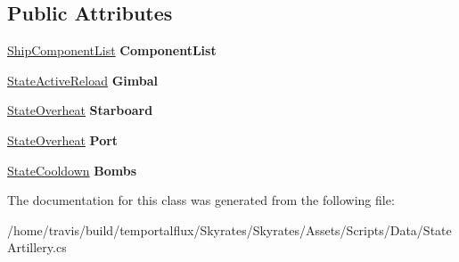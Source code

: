 \subsection*{Public Attributes}
\begin{DoxyCompactItemize}
\item 
\hypertarget{class_skyrates_1_1_data_1_1_state_artillery_a54162b2fadd29081814fb07464263928}{\hyperlink{class_skyrates_1_1_ship_1_1_ship_component_list}{Ship\-Component\-List} {\bfseries Component\-List}}\label{class_skyrates_1_1_data_1_1_state_artillery_a54162b2fadd29081814fb07464263928}

\item 
\hypertarget{class_skyrates_1_1_data_1_1_state_artillery_a6bb24342380db95bc7ca435bf143175c}{\hyperlink{class_skyrates_1_1_misc_1_1_state_active_reload}{State\-Active\-Reload} {\bfseries Gimbal}}\label{class_skyrates_1_1_data_1_1_state_artillery_a6bb24342380db95bc7ca435bf143175c}

\item 
\hypertarget{class_skyrates_1_1_data_1_1_state_artillery_a2dde97010bf9eab4c1537231e2c5d433}{\hyperlink{class_skyrates_1_1_misc_1_1_state_overheat}{State\-Overheat} {\bfseries Starboard}}\label{class_skyrates_1_1_data_1_1_state_artillery_a2dde97010bf9eab4c1537231e2c5d433}

\item 
\hypertarget{class_skyrates_1_1_data_1_1_state_artillery_a8f4401a53c2862f8cea695ca7133a458}{\hyperlink{class_skyrates_1_1_misc_1_1_state_overheat}{State\-Overheat} {\bfseries Port}}\label{class_skyrates_1_1_data_1_1_state_artillery_a8f4401a53c2862f8cea695ca7133a458}

\item 
\hypertarget{class_skyrates_1_1_data_1_1_state_artillery_aa993c508fc5331d7f3b3870f72a2d386}{\hyperlink{class_skyrates_1_1_misc_1_1_state_cooldown}{State\-Cooldown} {\bfseries Bombs}}\label{class_skyrates_1_1_data_1_1_state_artillery_aa993c508fc5331d7f3b3870f72a2d386}

\end{DoxyCompactItemize}


The documentation for this class was generated from the following file\-:\begin{DoxyCompactItemize}
\item 
/home/travis/build/temportalflux/\-Skyrates/\-Skyrates/\-Assets/\-Scripts/\-Data/State\-Artillery.\-cs\end{DoxyCompactItemize}
